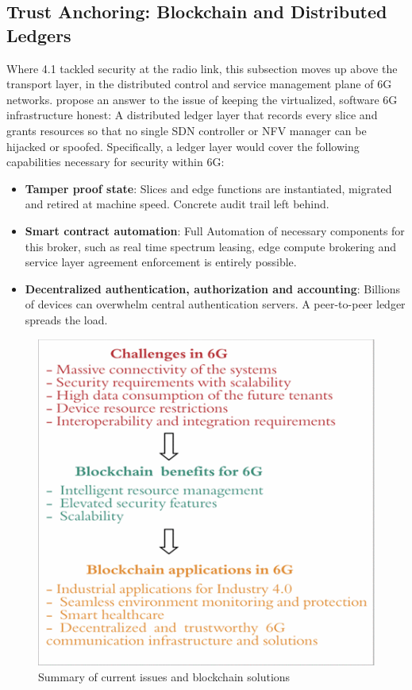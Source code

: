 \documentclass[acmtog]{acmart}
\begin{document}
\subsection{Trust Anchoring: Blockchain and Distributed Ledgers}
Where 4.1 tackled security at the radio link, this subsection moves up above the transport layer, in the distributed control and service management plane of 6G networks. \cite{ref2} propose an answer to the issue of keeping the virtualized, software 6G infrastructure honest: A distributed ledger layer that records every slice and grants resources so that no single SDN controller or NFV manager can be hijacked or spoofed. Specifically, a ledger layer would cover the following capabilities necessary for security within 6G:
\begin{itemize}
  \item \textbf{Tamper proof state}: Slices and edge functions are instantiated, migrated and retired at machine speed. Concrete audit trail left behind.
  \item \textbf{Smart contract automation}:  Full Automation of necessary components for this broker, such as real time spectrum leasing, edge compute brokering and service layer agreement enforcement is entirely possible.
  \item \textbf{Decentralized authentication, authorization and accounting}: Billions of devices can overwhelm central authentication servers. A peer-to-peer ledger spreads the load.
\end{itemize}
\begin{figure}[h]
  \centering
  \includegraphics[width=0.8\linewidth,keepaspectratio]{true_ref2_summary.png}
  \caption{Summary of current issues and blockchain solutions \cite{ref2}}
\end{figure}
\end{document}
